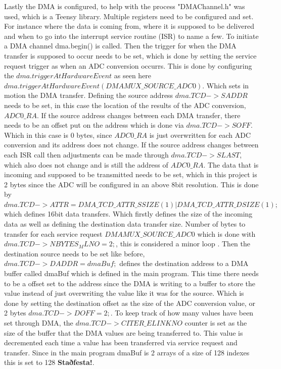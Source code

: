 Lastly the DMA is configured, to help with the process "DMAChannel.h" was used, which is a Teensy library.
Multiple registers need to be configured and set.
For instance where the data is coming from, where it is supposed to be delivered and when to go into the interrupt service routine (ISR) to name a few.
To initiate a DMA channel dma.begin() is called.
Then the trigger for when the DMA transfer is supposed to occur needs to be set, which is done by setting the service request trigger as when an ADC conversion occurrs.
This is done by configuring the $dma.triggerAtHardwareEvent$ as seen here $dma.triggerAtHardwareEvent(DMAMUX\_SOURCE\_ADC0)$.
Which sets in motion the DMA transfer.
Defining the source address $dma.TCD->SADDR$ needs to be set, in this case the location of the results of the ADC conversion, $ADC0\_RA$.
If the source address changes between each DMA transfer, there needs to be an offset put on the address which is done via $dma.TCD->SOFF$. 
Which in this case is 0 bytes, since $ADC0\_RA$ is just overwritten for each ADC conversion and its address does not change.
If the source address changes between each ISR call then adjustments can be made through $dma.TCD->SLAST$, which also does not change and is still the address of $ADC0\_RA$.
The data that is incoming and supposed to be transmitted needs to be set, which in this project is 2 bytes since the ADC will be configured in an above 8bit resolution.
This is done by $dma.TCD->ATTR = DMA\_TCD\_ATTR\_SSIZE(1) | DMA\_TCD\_ATTR\_DSIZE(1);$ which defines 16bit data transfers.
Which firstly defines the size of the incoming data as well as defining the destination data transfer size.
Number of bytes to transfer for each service request $DMAMUX\_SOURCE\_ADC0$ which is done with  $dma.TCD->NBYTES_MLNO = 2;$, this is considered a minor loop .
Then the destination source needs to be set like before, $dma.TCD->DADDR = dmaBuf;$ defines the destination address to a DMA buffer called dmaBuf which is defined in the main program.
This time there needs to be a offset set to the address since the DMA is writing to a buffer to store the value instead of just overwriting the value like it was for the source.
Which is done by setting the destination offset as the size of the ADC conversion value, or 2 bytes $dma.TCD->DOFF = 2;$.
To keep track of how many values have been set through DMA, the  $dma.TCD->CITER\_ELINKNO $ counter is set as the size of the buffer that the DMA values are being transferred to.
This value is decremented each time a value has been transferred via service request and transfer.
Since in the main program dmaBuf is 2 arrays of a size of 128 indexes this is set to 128 \textbf{Staðfesta!}.
